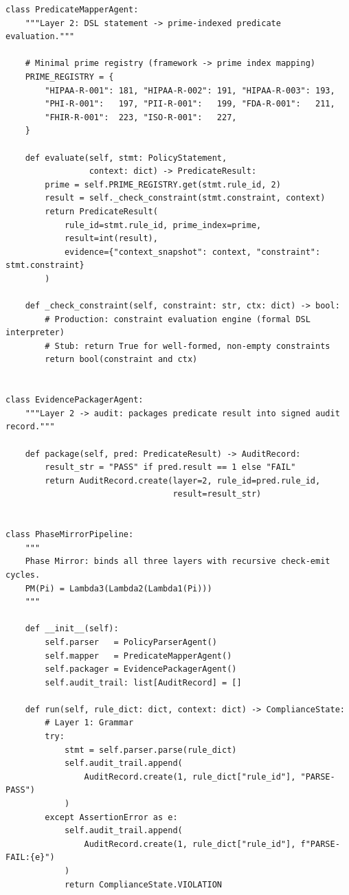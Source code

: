 \documentclass[12pt,letterpaper]{article}
\theoremstyle{definition}
\theoremstyle{plain}
\theoremstyle{remark}
\begin{document}
\begin{lstlisting}[style=pythonStyle,
  caption={PIRTM Policy Pack agent pipeline skeleton (Python 3.12+)}]
class PredicateMapperAgent:
    """Layer 2: DSL statement -> prime-indexed predicate evaluation."""

    # Minimal prime registry (framework -> prime index mapping)
    PRIME_REGISTRY = {
        "HIPAA-R-001": 181, "HIPAA-R-002": 191, "HIPAA-R-003": 193,
        "PHI-R-001":   197, "PII-R-001":   199, "FDA-R-001":   211,
        "FHIR-R-001":  223, "ISO-R-001":   227,
    }

    def evaluate(self, stmt: PolicyStatement,
                 context: dict) -> PredicateResult:
        prime = self.PRIME_REGISTRY.get(stmt.rule_id, 2)
        result = self._check_constraint(stmt.constraint, context)
        return PredicateResult(
            rule_id=stmt.rule_id, prime_index=prime,
            result=int(result),
            evidence={"context_snapshot": context, "constraint": stmt.constraint}
        )

    def _check_constraint(self, constraint: str, ctx: dict) -> bool:
        # Production: constraint evaluation engine (formal DSL interpreter)
        # Stub: return True for well-formed, non-empty constraints
        return bool(constraint and ctx)


class EvidencePackagerAgent:
    """Layer 2 -> audit: packages predicate result into signed audit record."""

    def package(self, pred: PredicateResult) -> AuditRecord:
        result_str = "PASS" if pred.result == 1 else "FAIL"
        return AuditRecord.create(layer=2, rule_id=pred.rule_id,
                                  result=result_str)


class PhaseMirrorPipeline:
    """
    Phase Mirror: binds all three layers with recursive check-emit cycles.
    PM(Pi) = Lambda3(Lambda2(Lambda1(Pi)))
    """

    def __init__(self):
        self.parser   = PolicyParserAgent()
        self.mapper   = PredicateMapperAgent()
        self.packager = EvidencePackagerAgent()
        self.audit_trail: list[AuditRecord] = []

    def run(self, rule_dict: dict, context: dict) -> ComplianceState:
        # Layer 1: Grammar
        try:
            stmt = self.parser.parse(rule_dict)
            self.audit_trail.append(
                AuditRecord.create(1, rule_dict["rule_id"], "PARSE-PASS")
            )
        except AssertionError as e:
            self.audit_trail.append(
                AuditRecord.create(1, rule_dict["rule_id"], f"PARSE-FAIL:{e}")
            )
            return ComplianceState.VIOLATION


\end{lstlisting}
\end{document}
